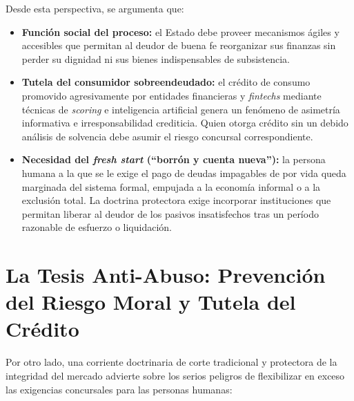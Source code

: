 \documentclass[12pt,oneside]{book}
\begin{document}
Desde esta perspectiva, se argumenta que:

\begin{itemize}
    \item \textbf{Función social del proceso:} el Estado debe proveer mecanismos ágiles y accesibles que permitan al deudor de buena fe reorganizar sus finanzas sin perder su dignidad ni sus bienes indispensables de subsistencia.

    \item \textbf{Tutela del consumidor sobreendeudado:} el crédito de consumo promovido agresivamente por entidades financieras y \textit{fintechs} mediante técnicas de \textit{scoring} e inteligencia artificial genera un fenómeno de asimetría informativa e irresponsabilidad crediticia. Quien otorga crédito sin un debido análisis de solvencia debe asumir el riesgo concursal correspondiente.

    \item \textbf{Necesidad del \textit{fresh start} (``borrón y cuenta nueva''):} la persona humana a la que se le exige el pago de deudas impagables de por vida queda marginada del sistema formal, empujada a la economía informal o a la exclusión total. La doctrina protectora exige incorporar instituciones que permitan liberar al deudor de los pasivos insatisfechos tras un período razonable de esfuerzo o liquidación.
\end{itemize}

\section{La Tesis Anti-Abuso: Prevención del Riesgo Moral y Tutela del Crédito}

Por otro lado, una corriente doctrinaria de corte tradicional y protectora de la integridad del mercado advierte sobre los serios peligros de flexibilizar en exceso las exigencias concursales para las personas humanas:
\end{document}
